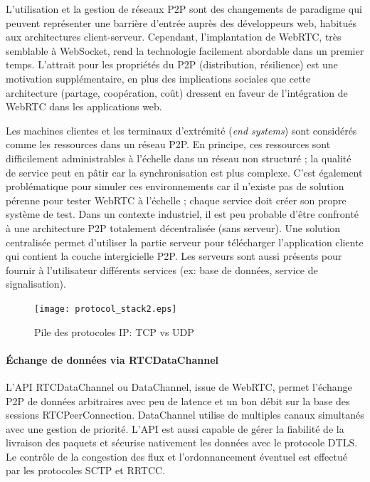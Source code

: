 L'utilisation et la gestion de réseaux \gls{P2P} sont des changements de paradigme 
qui peuvent représenter une 
barrière d'entrée auprès des développeurs web, habitués aux architectures 
client-serveur. 
Cependant, l'implantation de WebRTC, très semblable à WebSocket, rend la 
technologie facilement abordable dans un premier temps. L'attrait pour les 
propriétés du \gls{P2P} (distribution, résilience) est une motivation 
supplémentaire, en plus des implications sociales que cette architecture (partage, 
coopération, coût) dressent en faveur de l'intégration de WebRTC dans les 
applications web.

Les machines clientes et les terminaux d'extrémité (\textit{end systems}) 
sont considérés comme \og les ressources\fg{} dans un réseau 
\gls{P2P}. 
En principe, ces ressources sont difficilement administrables à l'échelle 
dans un réseau non structuré ; la qualité de service peut en pâtir car la 
synchronisation est plus complexe. C'est également problématique pour simuler 
ces environnements car il n'existe pas de solution pérenne pour tester WebRTC à 
l'échelle ; chaque service doit créer son propre système de test. 
Dans un contexte industriel, il est peu probable d'être confronté à une architecture 
\gls{P2P} totalement décentralisée (sans serveur). Une solution centralisée permet 
d'utiliser la partie serveur pour télécharger l'application cliente qui contient la 
couche intergicielle \gls{P2P}. 
Les serveurs sont aussi présents pour fournir à l'utilisateur différents services (ex: 
base de données, service de signalisation). 

\begin{figure}[ht]
	\centering
	\texttt{[image: protocol\_stack2.eps]}
	\caption{Pile des protocoles IP: TCP vs UDP}
	\label{fig:protocolstack}
\end{figure}
\paragraph{Échange de données via RTCDataChannel}
L'\gls{API} RTCDataChannel ou Data\-Channel, issue de  WebRTC, 
permet l'échange \gls{P2P} de données arbitraires avec peu de latence et 
un bon débit sur la base des sessions RTCPeerConnection.
DataChannel utilise de multiples canaux simultanés avec une gestion de 
priorité. L'\gls{API} est aussi capable de gérer la fiabilité de la livraison des 
paquets et sécurise nativement les données avec le protocole 
\gls{DTLS}. 
Le contrôle de la congestion des flux et l'ordonnancement éventuel est 
effectué par les protocoles \gls{SCTP} et \gls{RRTCC}. 

